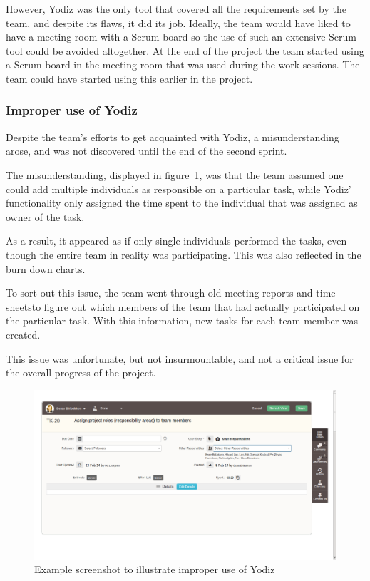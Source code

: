 However, Yodiz was the only tool that covered all the requirements set by the team, and despite its flaws, it did its job. Ideally, the team would have liked to have a meeting room with a Scrum board so the use of such an extensive Scrum tool could be avoided altogether. At the end of the project the team started using a Scrum board in the meeting room that was used during the work sessions. The team could have started using this earlier in the project.

\subsubsection{Improper use of Yodiz}
\label{sec:improperScrum}
Despite the team's efforts to get acquainted with Yodiz, a misunderstanding arose, and was not discovered until the end of the second sprint.

The misunderstanding, displayed in figure~\ref{fig:wrongUse}, was that the team
assumed one could add multiple individuals as responsible on a particular task,
while Yodiz' functionality only assigned the time spent to the individual that was assigned as owner of the task.

As a result, it appeared as if only single individuals performed the tasks, even though the entire team in reality was participating. This was also reflected in the burn down charts. 

To sort out this issue, the team went through old meeting reports and time sheetsto figure out which members of the team that had actually participated on the particular task. With this information, new tasks for each team member was created.

This issue was unfortunate, but not insurmountable, and not a critical
issue for the overall progress of the project.

\begin{figure}[H]
\includegraphics[width=\textwidth, clip, trim=1cm 2cm 4cm 1cm]{ch/retrospect/fig/wrongUse.png}
\caption{Example screenshot to illustrate improper use of Yodiz}
\label{fig:wrongUse}
\end{figure}

